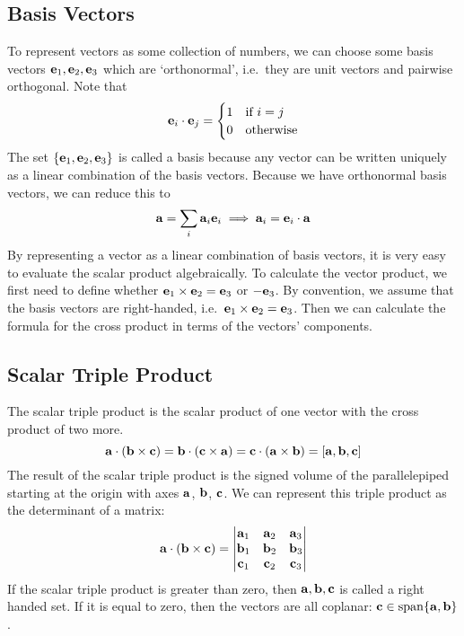 \subsection{Basis Vectors}
To represent vectors as some collection of numbers, we can choose some basis vectors \(\vb e_1, \vb e_2, \vb e_3\) which are `orthonormal', i.e.\ they are unit vectors and pairwise orthogonal.
Note that
\[
	\vb e_i \cdot \vb e_j = \begin{cases}
		1 & \text{if } i = j \\
		0 & \text{otherwise}
	\end{cases}
\]
The set \(\{ \vb e_1, \vb e_2, \vb e_3 \}\) is called a basis because any vector can be written uniquely as a linear combination of the basis vectors.
Because we have orthonormal basis vectors, we can reduce this to
\[
	\vb a = \sum_i \vb a_i \vb e_i \implies \vb a_i = \vb e_i \cdot \vb a
\]
By representing a vector as a linear combination of basis vectors, it is very easy to evaluate the scalar product algebraically.
To calculate the vector product, we first need to define whether \(\vb e_1 \times \vb e_2 = \vb e_3\) or \(-\vb e_3\).
By convention, we assume that the basis vectors are right-handed, i.e.\ \(\vb e_1 \times \vb e_2 = \vb e_3\).
Then we can calculate the formula for the cross product in terms of the vectors' components.

\subsection{Scalar Triple Product}
The scalar triple product is the scalar product of one vector with the cross product of two more.
\[
	\vb a \cdot (\vb b \times \vb c) = \vb b \cdot (\vb c \times \vb a) = \vb c \cdot (\vb a \times \vb b) = [\vb a, \vb b, \vb c]
\]
The result of the scalar triple product is the signed volume of the parallelepiped starting at the origin with axes \(\vb a\), \(\vb b\), \(\vb c\).
We can represent this triple product as the determinant of a matrix:
\[
	\vb a \cdot (\vb b \times \vb c) =
	\begin{vmatrix}
		\vb a_1 & \vb a_2 & \vb a_3 \\
		\vb b_1 & \vb b_2 & \vb b_3 \\
		\vb c_1 & \vb c_2 & \vb c_3
	\end{vmatrix}
\]
If the scalar triple product is greater than zero, then \(\vb a, \vb b, \vb c\) is called a right handed set.
If it is equal to zero, then the vectors are all coplanar: \(\vb c \in \operatorname{span} \{ \vb a, \vb b \}\).

